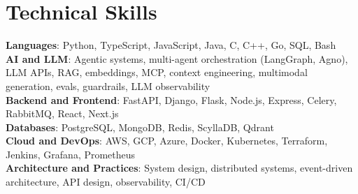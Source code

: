 \section{Technical Skills}
\small
\textbf{Languages}{: \small Python, TypeScript, JavaScript, Java, C, C++, Go, SQL, Bash} \\
\vspace{2.5pt}\textbf{AI and LLM}{: \small Agentic systems, multi-agent orchestration (LangGraph, Agno), LLM APIs, RAG, embeddings, MCP, context engineering, multimodal generation, evals, guardrails, LLM observability} \\
\vspace{2.5pt}\textbf{Backend and Frontend}{: \small FastAPI, Django, Flask, Node.js, Express, Celery, RabbitMQ, React, Next.js} \\
\vspace{2.5pt}\textbf{Databases}{: \small PostgreSQL, MongoDB, Redis, ScyllaDB, Qdrant} \\
\vspace{2.5pt}\textbf{Cloud and DevOps}{: \small AWS, GCP, Azure, Docker, Kubernetes, Terraform, Jenkins, Grafana, Prometheus} \\
\vspace{2.5pt}\textbf{Architecture and Practices}{: \small System design, distributed systems, event-driven architecture, API design, observability, CI/CD}

